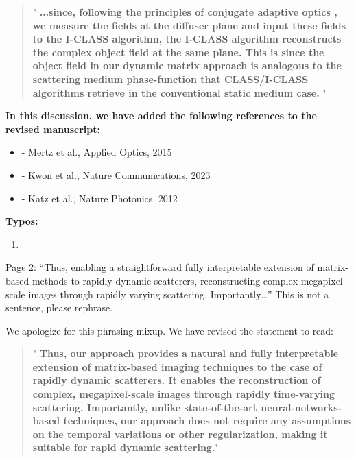 \documentclass[12pt]{article}
\newenvironment{solved_reviewercomment}
    {\begin{tcolorbox}[width=\linewidth,colback=gray!5,colframe=solved_commentcolor!50,title=Reviewer Comment,left=5pt,right=5pt]}
    {\end{tcolorbox}}
\newenvironment{finished_ourresponse}
    {\begin{tcolorbox}[width=\linewidth,breakable,enhanced,colback=gray!5,colframe=finished_responsecolor!50,title=Response,left=5pt,right=5pt]}
    {\end{tcolorbox}}
\begin{document}
\begin{finished_ourresponse}
    \begin{quote}
        "{\bfseries
        ...since, following the principles of conjugate adaptive optics \cite{mertz2015field, kwon2023computational, sunray2024beyond, katz2012looking}, we measure the fields at the diffuser plane and input these fields to the I-CLASS algorithm, the I-CLASS algorithm reconstructs the complex object field at the same plane. This is since the object field in our dynamic matrix approach is analogous to the scattering medium phase-function that CLASS/I-CLASS algorithms retrieve in the conventional static medium case.}
        "
    \end{quote}
    \textbf{In this discussion, we have added the following references to the revised manuscript:}
    \begin{itemize}[nosep]
    \item \cite{mertz2015field} - Mertz et al., Applied Optics, 2015
    \item \cite{kwon2023computational} - Kwon et al., Nature Communications, 2023
    \item \cite{katz2012looking} - Katz et al., Nature Photonics, 2012
    \end{itemize}
\end{finished_ourresponse}


\textbf{Typos:}

\begin{enumerate}[label=\arabic*., resume]
\item \leavevmode
\end{enumerate}
\vspace{-1em}
\begin{solved_reviewercomment}
    Page 2: “Thus, enabling a straightforward fully interpretable extension of matrix-based methods to rapidly dynamic scatterers, reconstructing complex megapixel-scale images through rapidly varying scattering. Importantly…” This is not a sentence, please rephrase.
\end{solved_reviewercomment}

\begin{finished_ourresponse}
    We apologize for this phrasing mixup. We have revised the statement to read:
    
    \begin{quote}
        "{\bfseries
        Thus, our approach provides a natural and fully interpretable extension of matrix-based imaging techniques to the case of rapidly dynamic scatterers. 
        It enables the reconstruction of complex, megapixel-scale images through rapidly time-varying scattering. Importantly, unlike state-of-the-art neural-networks-based techniques, our approach does not require any assumptions on the temporal variations or other regularization, making it suitable for rapid dynamic scattering.}"
    \end{quote}
    
\end{finished_ourresponse}
\end{document}
